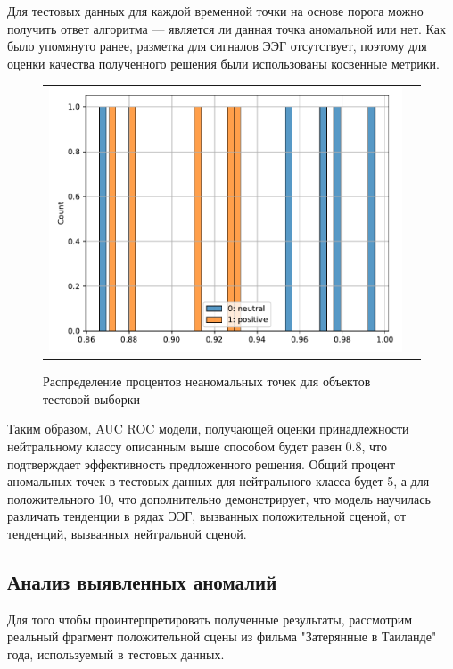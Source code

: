 \documentclass{article}
\begin{document}
Для тестовых данных для каждой временной точки на основе порога можно получить ответ алгоритма --- является ли данная точка аномальной или нет. Как было упомянуто ранее, разметка для сигналов ЭЭГ отсутствует, поэтому для оценки качества полученного решения были использованы косвенные метрики.

\begin{figure}[h]
\begin{tabular}{cc}
  \includegraphics[width=160mm]{8.pdf}
\end{tabular}
\caption{Распределение процентов неаномальных точек для объектов тестовой выборки}
\end{figure}

Таким образом, AUC ROC модели, получающей оценки принадлежности нейтральному классу описанным выше способом будет равен 0.8, что подтверждает эффективность предложенного решения. Общий процент аномальных точек в тестовых данных для нейтрального класса будет 5, а для положительного 10, что дополнительно демонстрирует, что модель научилась различать тенденции в рядах ЭЭГ, вызванных положительной сценой, от тенденций, вызванных нейтральной сценой.

\subsection{Анализ выявленных аномалий}

Для того чтобы проинтерпретировать полученные результаты, рассмотрим реальный фрагмент положительной сцены из фильма "Затерянные в Таиланде"  года, используемый в тестовых данных. 
\end{document}
